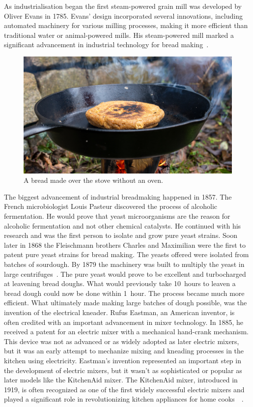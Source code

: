 As industrialisation began the first steam-powered grain mill was developed by
Oliver Evans in \num{1785}. Evans' design incorporated several innovations,
including automated machinery for various milling processes, making it more
efficient than traditional water or animal-powered mills. His steam-powered
mill marked a significant advancement in industrial technology for bread
making~\cite{evans+mill}.

\begin{figure}[ht]
  \includegraphics[width=\textwidth]{sourdough-stove}
  \caption{A bread made over the stove without an oven.}%
  \label{sourdough-stove}
\end{figure}

The biggest advancement of industrial breadmaking happened in \num{1857}.
The French microbiologist Louis Pasteur discovered
the process of alcoholic fermentation. He would prove that
yeast microorganisms are the reason for alcoholic fermentation
and not other chemical catalysts. He continued with his research and
was the first person to isolate and grow pure yeast strains.
Soon later in \num{1868} the Fleischmann brothers Charles
and Maximilian were the first to patent pure yeast strains
for bread making. The yeasts offered
were isolated from batches of sourdough. By \num{1879} the machinery was built
to multiply the yeast in large centrifuges~\cite{fleischmann+history}.
The pure yeast would prove to be excellent and turbocharged
at leavening bread doughs. What would previously take 10~hours
to leaven a bread dough could now be done within 1~hour.
The process became much more efficient. What ultimately made making large
batches of dough possible, was the invention of the electrical kneader.  Rufus
Eastman, an American inventor, is often credited with an important advancement
in mixer technology. In \num{1885}, he received a patent for an electric mixer
with a mechanical hand-crank mechanism.  This device was not as advanced or as
widely adopted as later electric mixers, but it was an early attempt to
mechanize mixing and kneading processes in the kitchen using electricity.
Eastman's invention represented an important step in the development of
electric mixers, but it wasn't as sophisticated or popular as later models
like the KitchenAid mixer. The KitchenAid mixer, introduced in \num{1919}, is
often recognized as one of the first widely successful electric mixers and
played a significant role in revolutionizing kitchen appliances for home
cooks~\cite{first+mixer}~\cite{kitchenaid+history}.

